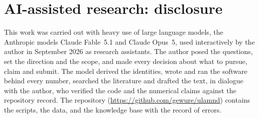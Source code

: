 \documentclass[11pt,a4paper]{article}
\theoremstyle{remark}\newtheorem{remark}[theorem]{Remark}
\begin{document}
\section*{AI-assisted research: disclosure}
This work was carried out with heavy use of large language models, the Anthropic models Claude Fable~5.1 and Claude
Opus~5, used interactively by the author in September 2026 as research assistants. The author posed the questions, set
the direction and the scope, and made every decision about what to pursue, claim and submit. The model derived the
identities, wrote and ran the software behind every number, searched the literature and drafted the text, in dialogue
with the author, who verified the code and the numerical claims against the repository record. The repository
(\url{https://github.com/gewure/ulamnd}) contains the scripts, the data, and the knowledge base with the record of errors.



\end{document}
